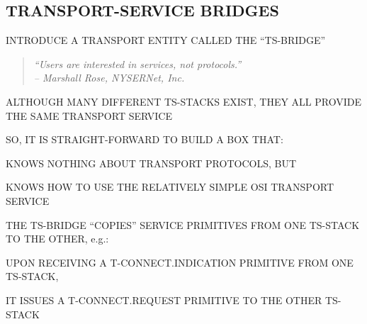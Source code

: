 \begin{bwslide}
\part*	{TRANSPORT-SERVICE BRIDGES}\bf

\begin{nrtc}
\item	INTRODUCE A TRANSPORT ENTITY CALLED THE ``TS-BRIDGE''
\begin{quote}\em
``Users are interested in services, not protocols.''\\ \raggedleft
-- Marshall Rose, NYSERNet, Inc.
\end{quote}

\item	ALTHOUGH MANY DIFFERENT TS-STACKS EXIST,
	THEY ALL PROVIDE THE SAME TRANSPORT SERVICE

\item	SO, IT IS STRAIGHT-FORWARD TO BUILD A BOX THAT:
    \begin{nrtc}
    \item	KNOWS NOTHING ABOUT TRANSPORT PROTOCOLS, BUT

    \item	KNOWS HOW TO USE THE RELATIVELY SIMPLE OSI TRANSPORT SERVICE
    \end{nrtc}
\end{nrtc}
\end{bwslide}


\begin{bwslide}

\begin{nrtc}
\item	THE TS-BRIDGE ``COPIES'' SERVICE PRIMITIVES FROM ONE TS-STACK TO THE
	OTHER, e.g.:
    \begin{nrtc}
    \item	UPON RECEIVING A T-CONNECT.INDICATION PRIMITIVE FROM ONE
		TS-STACK,

    \item	IT ISSUES A T-CONNECT.REQUEST PRIMITIVE TO THE OTHER TS-STACK
    \end{nrtc}
\end{nrtc}
\end{bwslide}




